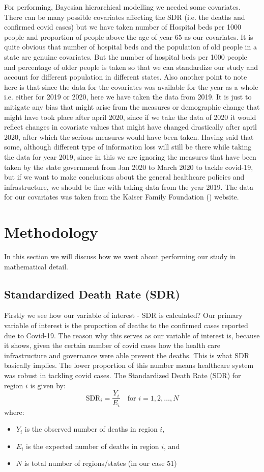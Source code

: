 \documentclass[enabledeprecatedfontcommands,parskip=half,twoside=semi,BCOR=0mm]{scrreprt}
\numberwithin{equation}{chapter}
\theoremstyle{definition}
\theoremstyle{remark}
\begin{document}
    For performing, Bayesian  hierarchical modelling we needed some covariates. There can be many possible covariates affecting the SDR (i.e. the deaths and confirmed covid cases) but we have taken number of Hospital beds per 1000 people and proportion of people above the age of year 65 as our covariates. It is quite obvious that number of hospital beds and the population of old people in a state are genuine covariates. But the number of hospital beds per 1000 people and  percentage of older people is taken so that we can standardize our study and account for different population in different states. Also another point to note here is that since the data for the covariates was available for the year as a whole i.e. either for 2019 or 2020, here we have taken the data from 2019. It is just to mitigate any bias that might arise from the measures or demographic change that might have took place after april 2020, since if we take the data of 2020 it would reflect changes in covariate values that might have changed drastically after april 2020, after which the serious measures would have been taken. Having said that some, although different type of information loss will still be there while taking the data for year 2019, since in this we are ignoring the measures that have been taken by the state government from Jan 2020 to March 2020 to tackle covid-19, but if we want to make conclusions about the general healthcare policies and infrastructure, we should be fine with taking data from the year 2019. The data for our covariates was taken from the Kaiser Family Foundation (\cite{KFF}) website.
    
    \chapter{Methodology}
    In this section we will discuss how we went about performing our study in mathematical detail. 

    \section{Standardized Death Rate (SDR)}
    Firstly we see how our variable of interest - SDR is calculated?
    Our primary variable of interest is the proportion of deaths to the confirmed cases reported due to Covid-19. The reason why this serves as our variable of interest is, because it shows, given the certain number of covid cases how the health care infrastructure and governance were able prevent the deaths. This is what SDR basically implies. The lower proportion of this number means healthcare system was robust in tackling covid cases.
    The Standardized Death Rate (SDR) for region \(i\) is given by:
    \[
    \text{SDR}_i = \frac{Y_i}{E_i} \quad \text{for } i = 1, 2, \ldots, N
    \]
    where:
    \begin{itemize}
        \item \(Y_i\) is the observed number of deaths in region \(i\),
        \item \(E_i\) is the expected number of deaths in region \(i\), and
        \item \(N\) is total number of regions/states (in our case 51)
    \end{itemize}
\end{document}
